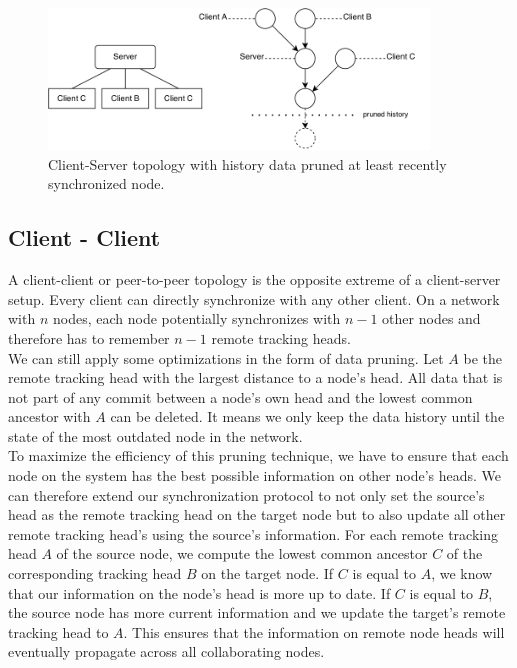 \begin{figure}[H]
  \centering
  \includegraphics[width=0.9\textwidth]{img/client-server}
  \caption{Client-Server topology with history data pruned at least recently synchronized node.}
  \label{fig:histo.topologies.client-server}
\end{figure}

\subsection{Client - Client}
\label{sec:histo.topologies.p2p}
A client-client or peer-to-peer topology is the opposite extreme of a client-server setup.
Every client can directly synchronize with any other client.
On a network with $ n $ nodes, each node potentially synchronizes with $ n - 1 $ other nodes and therefore has to remember $ n - 1 $ remote tracking heads.\\
We can still apply some optimizations in the form of data pruning.
Let $ A $ be the remote tracking head with the largest distance to a node's head.
All data that is not part of any commit between a node's own head and the lowest common ancestor with $ A $ can be deleted.
It means we only keep the data history until the state of the most outdated node in the network.\\
To maximize the efficiency of this pruning technique, we have to ensure that each node on the system has the best possible information on other node's heads.
We can therefore extend our synchronization protocol to not only set the source's head as the remote tracking head on the target node but to also update all other remote tracking head's using the source's information.
For each remote tracking head $ A $ of the source node, we compute the lowest common ancestor $ C $ of the corresponding tracking head $ B $ on the target node.
If $ C $ is equal to $ A $, we know that our information on the node's head is more up to date.
If $ C $ is equal to $ B $, the source node has more current information and we update the target's remote tracking head to $ A $.
This ensures that the information on remote node heads will eventually propagate across all collaborating nodes.\\

